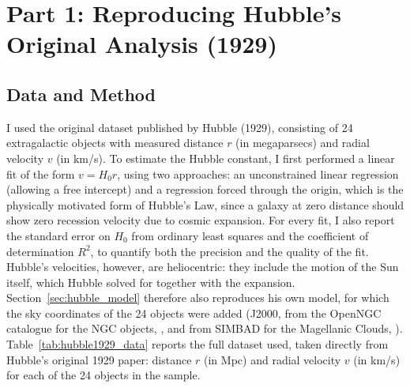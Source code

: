\documentclass[11pt]{article}
\begin{document}
\section{Part 1: Reproducing Hubble's Original Analysis (1929)}
\subsection{Data and Method}
I used the original dataset published by Hubble (1929), consisting of 24 extragalactic objects with measured distance $r$ (in megaparsecs) and radial velocity $v$ (in km/s). To estimate the Hubble constant, I first performed a linear fit of the form $v = H_0r$, using two approaches: an unconstrained linear regression (allowing a free intercept) and a regression forced through the origin, which is the physically motivated form of Hubble's Law, since a galaxy at zero distance should show zero recession velocity due to cosmic expansion. For every fit, I also report the standard error on $H_0$ from ordinary least squares and the coefficient of determination $R^2$, to quantify both the precision and the quality of the fit. Hubble's velocities, however, are heliocentric: they include the motion of the Sun itself, which Hubble solved for together with the expansion. Section~\ref{sec:hubble_model} therefore also reproduces his own model, for which the sky coordinates of the 24 objects were added (J2000, from the OpenNGC catalogue for the NGC objects, \citealt{openngc}, and from SIMBAD for the Magellanic Clouds, \citealt{simbad}).
Table~\ref{tab:hubble1929_data} reports the full dataset used, taken directly from Hubble's original 1929 paper: distance $r$ (in Mpc) and radial velocity $v$ (in km/s) for each of the 24 objects in the sample.
\end{document}
